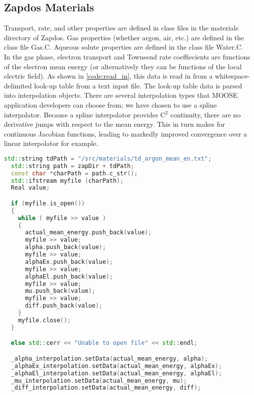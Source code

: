 \subsection{Zapdos Materials}
\label{sec:zap_materials}

Transport, rate, and other properties are defined in class files in the materials directory of Zapdos. Gas properties (whether argon, air, etc.) are defined in the class file Gas.C. Aqueous solute properties are defined in the class file Water.C. In the gas phase, electron transport and Townsend rate coeffiecients are functions of the electron mean energy (or alternatively they can be functions of the local electric field). As shown in \cref{code:read_in}, this data is read in from a whitespace-delimited look-up table from a text input file. The look-up table data is parsed into interpolation objects. There are several interpolation types that MOOSE application developers can choose from; we have chosen to use a spline interpolator. Because a spline interpolator provides C$^2$ continuity, there are no derivative jumps with respect to the mean energy. This in turn makes for continuous Jacobian functions, leading to markedly improved convergence over a linear interpolator for example.

\begin{lstlisting}[language=C++, caption = Code for reading in electron transport and Townsend coefficient data from a lookup table in a text file, label = code:read_in]
  std::string tdPath = "/src/materials/td_argon_mean_en.txt";
  std::string path = zapDir + tdPath;
  const char *charPath = path.c_str();
  std::ifstream myfile (charPath);
  Real value;

  if (myfile.is_open())
  {
    while ( myfile >> value )
    {
      actual_mean_energy.push_back(value);
      myfile >> value;
      alpha.push_back(value);
      myfile >> value;
      alphaEx.push_back(value);
      myfile >> value;
      alphaEl.push_back(value);
      myfile >> value;
      mu.push_back(value);
      myfile >> value;
      diff.push_back(value);
    }
    myfile.close();
  }

  else std::cerr << "Unable to open file" << std::endl;

  _alpha_interpolation.setData(actual_mean_energy, alpha);
  _alphaEx_interpolation.setData(actual_mean_energy, alphaEx);
  _alphaEl_interpolation.setData(actual_mean_energy, alphaEl);
  _mu_interpolation.setData(actual_mean_energy, mu);
  _diff_interpolation.setData(actual_mean_energy, diff);
\end{lstlisting}

